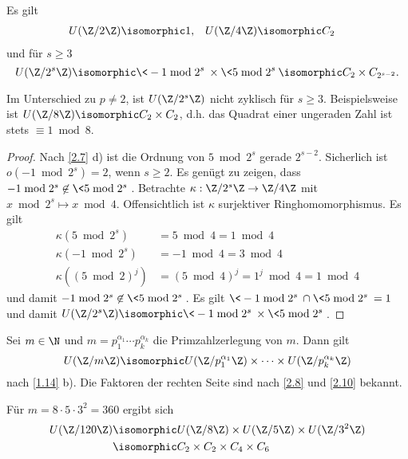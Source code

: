 \begin{st} \label{2.10}
	Es gilt
	\begin{align*}
		U(\Z / 2 \Z) &\isomorphic 1, &
		U(\Z / 4 \Z) &\isomorphic C_2
	\end{align*}
	und für $s \ge 3$
	\[
		U(\Z / 2^s \Z)
		\isomorphic \< - 1 \bmod 2^s \> \times \< 5 \bmod 2^s \>
		\isomorphic C_2 \times C_{2^{s-2}}.
	\]
	\begin{note}
		Im Unterschied zu $p \neq 2$, ist $U(\Z / 2^s \Z)$ nicht zyklisch für $s \ge 3$.
		Beispielsweise ist $U(\Z / 8 \Z) \isomorphic C_2 \times C_2$, d.h. das Quadrat einer ungeraden Zahl ist stets $\equiv 1 \bmod 8$.
	\end{note}
	\begin{proof}
		Nach \ref{2.7} d) ist die Ordnung von $5 \bmod 2^s$ gerade $2^{s-2}$.
		Sicherlich ist $o(-1 \bmod 2^s) = 2$, wenn $s \ge 2$.
		Es genügt zu zeigen, dass $-1 \bmod 2^s \not\in \< 5 \bmod 2^s \>$.
		Betrachte $\kappa: \Z / 2^s \Z \to \Z / 4 \Z$ mit $x \bmod 2^s \mapsto x \bmod 4$.
		Offensichtlich ist $\kappa$ surjektiver Ringhomomorphismus.
		Es gilt
		\begin{align*}
			\kappa(5 \bmod 2^s) &= 5 \bmod 4 = 1 \bmod 4 \\
			\kappa(-1 \bmod 2^s) &= -1 \bmod 4 = 3 \bmod 4 \\
			\kappa((5 \bmod 2)^j) &= (5 \bmod 4)^j = 1^j \bmod 4 = 1 \bmod 4
		\end{align*}
		und damit $-1 \bmod 2^s \not\in \< 5 \bmod 2^s\>$.
		Es gilt $\<-1 \bmod 2^s\> \cap \< 5 \bmod 2^s\> = 1$ und damit $U(\Z / 2^s \Z) \isomorphic \<-1 \bmod 2^s \> \times \< 5 \bmod 2^s \>$.
	\end{proof}
\end{st}

\begin{kor} \label{2.11}
	Sei $m \in \N$ und $m = p_1^{\alpha_1} \dotsb p_k^{\alpha_k}$ die Primzahlzerlegung von $m$.
	Dann gilt
	\[
		U(\Z / m\Z) \isomorphic U(\Z / p_1^{\alpha_1}\Z) \times \dotsb \times U(\Z / p_k^{\alpha_k} \Z)
	\]
	nach \ref{1.14} b).
	Die Faktoren der rechten Seite sind nach \ref{2.8} und \ref{2.10} bekannt.
\end{kor}

\begin{ex*}
	Für $m = 8 \cdot 5 \cdot 3^2 = 360$ ergibt sich
	\begin{align*}
		U(\Z / 120 \Z)
		&\isomorphic U(\Z / 8 \Z) \times U(\Z / 5 \Z) \times U(\Z / 3^2 \Z) \\
		&\isomorphic C_2 \times C_2 \times C_4 \times C_6
	\end{align*}
\end{ex*}

